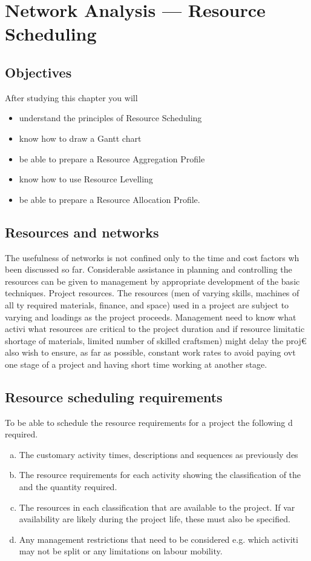 \documentclass[]{report}
\begin{document}
	
	\section{Network Analysis — Resource Scheduling }	
	
	\subsection*{Objectives} After studying this chapter you will 
	\begin{itemize}
		\item  understand the principles of Resource Scheduling 
		\item  know how to draw a Gantt chart 
		\item  be able to prepare a Resource Aggregation Profile 
		\item  know how to use Resource Levelling 
		\item  be able to prepare a Resource Allocation Profile. 
	\end{itemize}
	\subsection*{Resources and networks} 
	The usefulness of networks is not confined only to the time and cost factors wh been discussed so far. Considerable assistance in planning and controlling the resources can be given to management by appropriate development of the basic techniques. Project resources. The resources (men of varying skills, machines of all ty required materials, finance, and space) used in a project are subject to varying and loadings as the project proceeds. Management need to know what activi what resources are critical to the project duration and if resource limitatic shortage of materials, limited number of skilled craftsmen) might delay the proj€ also wish to ensure, as far as possible, constant work rates to avoid paying ovt one stage of a project and having short time working at another stage. 
	\subsection*{Resource scheduling requirements} To be able to schedule the resource requirements for a project the following d required.
	\begin{enumerate}[(a)]
		\item The customary activity times, descriptions and sequences as previously des 
		\item The resource requirements for each activity showing the classification of the and the quantity required.
		\item The resources in each classification that are available to the project. If var availability are likely during the project life, these must also be specified. 
		\item Any management restrictions that need to be considered e.g. which activiti may not be split or any limitations on labour mobility. 
	\end{enumerate}
\end{document}
